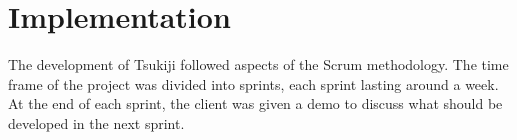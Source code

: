 \section{Implementation}
\label{implementation}
The development of Tsukiji followed aspects of the Scrum methodology. The time frame of the project was divided into sprints, each sprint lasting around a week. 
At the end of each sprint, the client was given a demo to discuss what should be developed in the next sprint.





